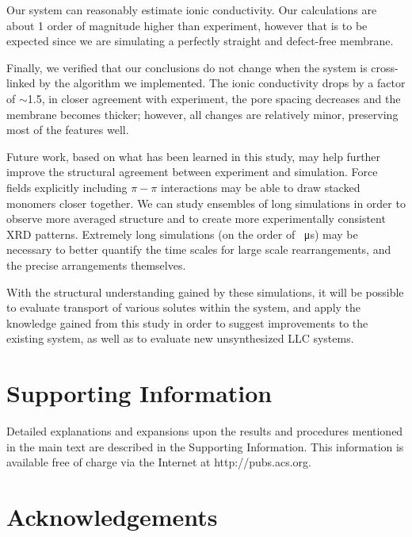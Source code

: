 \documentclass[journal=jpcbfk,manuscript=article]{achemso}
\begin{document}

  Our system can reasonably estimate ionic conductivity. Our
  calculations are about 1 order of magnitude higher than experiment, however
  that is to be expected since we are simulating a perfectly straight and
  defect-free membrane. 

  Finally, we verified that our conclusions do not change when the system is
  cross-linked by the algorithm we implemented. The ionic conductivity drops by a factor
  of $\sim$1.5, in closer agreement with experiment, the pore spacing decreases and
  the membrane becomes thicker; however, all changes are relatively minor, 
  preserving most of the features well.

  Future work, based on what has been learned in this study, may help further
  improve the structural agreement between experiment and simulation. Force 
  fields explicitly including $\pi-\pi$ interactions may be able to draw stacked
  monomers closer together. We can study ensembles of long simulations in order
  to observe more averaged structure and to create more experimentally consistent
  XRD patterns. Extremely long simulations (on the order of \SI{}{\micro s}) may
  be necessary to better quantify the time scales for large scale rearrangements,
  and the precise arrangements themselves.

  With the structural understanding gained by these simulations, it will be
  possible to evaluate transport of various solutes within the system, and apply the
  knowledge gained from this study in order to suggest improvements to the
  existing system, as well as to evaluate new unsynthesized LLC systems.

  \section*{Supporting Information}
  
  Detailed explanations and expansions upon the results and procedures mentioned in 
  the main text are described in the Supporting Information. This information is 
  available free of charge via the Internet at http://pubs.acs.org.

  \section*{Acknowledgements}
\end{document}
